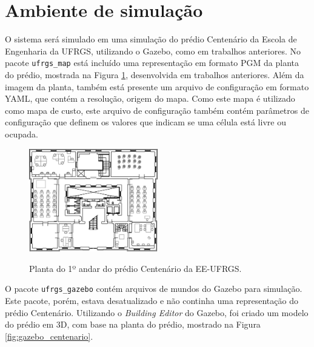 \documentclass[repeatfields,xlists,xpacks,oneside,yearsonly]{ufrgscca}
\begin{document}
\section{Ambiente de simulação}

O sistema será simulado em uma simulação do prédio Centenário da Escola de Engenharia
da UFRGS, utilizando o Gazebo, como em trabalhos anteriores.
No pacote \texttt{ufrgs\_map} está incluído uma representação em formato PGM da
planta do prédio, mostrada na Figura \ref{fig:planta_centenario}, desenvolvida em
trabalhos anteriores.
Além da imagem da planta, também está presente um arquivo de configuração 
em formato YAML, que contém a resolução, origem do mapa.
Como este mapa é utilizado como mapa de custo, este arquivo de configuração
também contém parâmetros de configuração 
que definem os valores que indicam se uma célula está livre ou ocupada.

\begin{figure}[h]
    {
        \centering
        \caption{Planta do 1º andar do prédio Centenário da EE-UFRGS.}
        \label{fig:planta_centenario}
        \includegraphics[width=0.5\textwidth]{centenario_floor_plan.png}\\
    }
    {}
\end{figure}

O pacote \texttt{ufrgs\_gazebo} contém arquivos de mundos do Gazebo para 
simulação. 
Este pacote, porém, estava desatualizado e não continha uma representação do
prédio Centenário.
Utilizando o \textit{Building Editor} do Gazebo, foi criado um modelo do prédio
em 3D, com base na planta do prédio, mostrado na Figura \ref{fig:gazebo_centenario}.
\end{document}
